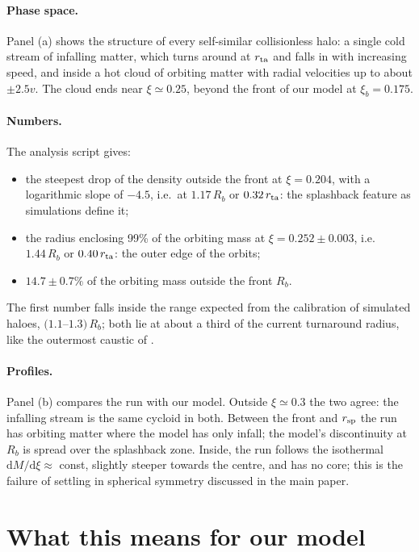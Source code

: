\documentclass[11pt,a4paper]{article}
\newcommand{\dd}{\mathrm{d}}
\newcommand{\Rb}{R_b}
\newcommand{\rsp}{r_{\rm sp}}
\newcommand{\rta}{r_{\rm ta}}
\begin{document}
\paragraph{Phase space.} Panel (a) shows the structure of every
self-similar collisionless halo: a single cold stream of infalling
matter, which turns around at $\rta$ and falls in with increasing speed,
and inside a hot cloud of orbiting matter with radial velocities up to
about $\pm2.5v$. The cloud ends near $\xi\simeq0.25$, beyond the front of
our model at $\xi_b=0.175$.

\paragraph{Numbers.} The analysis script gives:
\begin{itemize}
\item the steepest drop of the density outside the front at
  $\xi=0.204$, with a logarithmic slope of $-4.5$, i.e.\ at
  $1.17\,\Rb$ or $0.32\,\rta$: the splashback feature as simulations
  define it;
\item the radius enclosing 99\% of the orbiting mass at
  $\xi=0.252\pm0.003$, i.e.\ $1.44\,\Rb$ or $0.40\,\rta$: the outer edge
  of the orbits;
\item $14.7\pm0.7\%$ of the orbiting mass outside the front $\Rb$.
\end{itemize}
The first number falls inside the range expected from the calibration of
simulated haloes, $(1.1$--$1.3)\,\Rb$; both lie at about a third of the
current turnaround radius, like the outermost caustic of
\citet{Bertschinger1985}.

\paragraph{Profiles.} Panel (b) compares the run with our model. Outside
$\xi\simeq0.3$ the two agree: the infalling stream is the same cycloid
in both. Between the front and $\rsp$ the run has orbiting matter where
the model has only infall; the model's discontinuity at $\Rb$ is spread
over the splashback zone. Inside, the run follows the isothermal
$\dd M/\dd\xi\approx$ const, slightly steeper towards the centre, and has
no core; this is the failure of settling in spherical symmetry discussed
in the main paper.

\section{What this means for our model}
\end{document}
